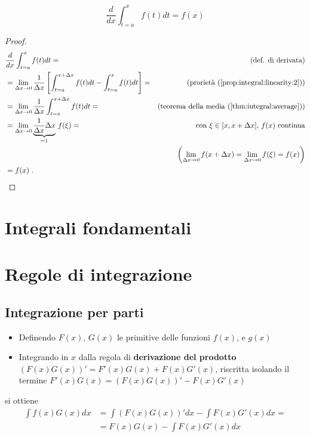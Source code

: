 \begin{theorem} 
    \begin{equation}
        \dfrac{d}{dx} \int_{t=a}^{x} f(t) dt = f(x)
    \end{equation}
\end{theorem}
\begin{proof}
\begin{equation}
    \begin{aligned}
        & \dfrac{d}{dx} \int_{t=a}^{x} f(t) dt = & \text{(def. di derivata)} \\ 
        & = \lim_{\Delta x \rightarrow 0} \dfrac{1}{\Delta x} \left[ \int_{t=a}^{x+\Delta x} f(t) dt - \int_{t=a}^{x} f(t) dt\right] = & \text{(prorietà (\ref{prop:integral:linearity:2}))} \\
        & = \lim_{\Delta x \rightarrow 0} \dfrac{1}{\Delta x} \int_{t=x}^{x+\Delta x} f(t) dt = & \text{(teorema della media (\ref{thm:integral:average}))} \\
        & = \lim_{\Delta x \rightarrow 0} \underbrace{\dfrac{1}{\Delta x} \Delta x}_{=1} \, f(\xi) = & \text{con $\xi \in [x, x+\Delta x]$, $f(x)$ continua} \\
        \vspace{-30pt} & & \text{$\left(\lim_{\Delta x \rightarrow 0} f(x+\Delta x) = \lim_{\Delta x \rightarrow 0} f(\xi) = f(x) \right)$} \\
        & = f(x)  \  .
    \end{aligned}
\end{equation}
\end{proof}

\section{Integrali fondamentali}

\section{Regole di integrazione}
\subsection{Integrazione per parti}
\begin{itemize}
 \item Definendo $F(x)$, $G(x)$ le primitive delle funzioni $f(x)$, e $g(x)$
 \item Integrando in $x$ dalla regola di \textbf{derivazione del prodotto} $(F(x)G(x))' = F'(x)G(x) + F(x)G'(x)$, riscritta isolando il termine $F'(x)G(x) = (F(x)G(x))' - F(x)G'(x)$
\end{itemize}
si ottiene
\begin{equation}
\begin{aligned}
    \int f(x) G(x) dx & = \int (F(x) G(x))' dx - \int F(x) G'(x) dx = \\
    &= F(x)G(x) - \int F(x) G'(x) dx 
\end{aligned}
\end{equation}

